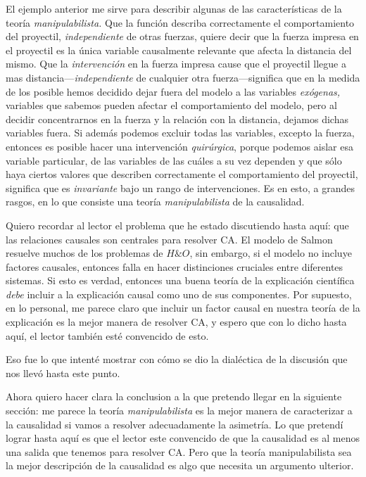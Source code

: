 {{El ejemplo anterior me sirve para describir algunas de las
características de la teoría \emph{manipulabilista.} Que la
función describa correctamente el comportamiento del
proyectil, \emph{independiente} de otras fuerzas, quiere
decir que la fuerza impresa en el proyectil es la única
variable causalmente relevante que afecta la distancia del
mismo. Que la \emph{intervención} en la fuerza impresa
cause que el proyectil llegue a mas
distancia---\emph{independiente} de cualquier otra
fuerza---significa que en la medida de los posible hemos
decidido dejar fuera del modelo a las variables
\emph{exógenas,} variables que sabemos pueden afectar el
comportamiento del modelo, pero al decidir concentrarnos en
la fuerza y la relación con la distancia, dejamos dichas
variables fuera. Si además podemos excluir todas las
variables, excepto la fuerza, entonces es posible hacer una
intervención \emph{quirúrgica}, porque podemos aislar esa
variable particular, de las variables de las cuáles a su vez
dependen y que sólo haya ciertos valores que describen
correctamente el comportamiento del proyectil, significa que
es \emph{invariante} bajo un rango de intervenciones. Es en
esto, a grandes rasgos, en lo que consiste una teoría
\emph{manipulabilista} de la causalidad.

Quiero recordar al lector el problema que he estado
discutiendo hasta aquí: que las
relaciones causales son centrales para resolver CA. El
modelo de Salmon resuelve muchos de los problemas de $H \&
O$, sin embargo, si el modelo no incluye factores causales,
entonces falla en hacer distinciones cruciales entre
diferentes sistemas. Si esto
es verdad, entonces una buena teoría de la explicación
científica \emph{debe} incluir a la explicación causal como
uno de sus componentes. Por supuesto, en lo personal, me
parece claro que incluir un factor causal en nuestra teoría
de la explicación es la mejor manera de resolver CA, y
espero que con lo dicho hasta aquí, el lector
también esté convencido de esto.

Eso fue lo que
intenté mostrar con cómo se dio la dialéctica de la discusión
que nos llevó hasta este punto.

Ahora quiero hacer clara la conclusion a la que pretendo
llegar en la siguiente sección: me parece la teoría
\emph{manipulabilista} es la mejor manera de caracterizar a
la causalidad si vamos a resolver adecuadamente la
asimetría. Lo que pretendí lograr hasta aquí es que el
lector este convencido de que la causalidad es al menos una
salida que tenemos para resolver CA. Pero que la teoría
manipulabilista sea la mejor descripción de la causalidad es
algo que necesita un argumento ulterior.

}}
